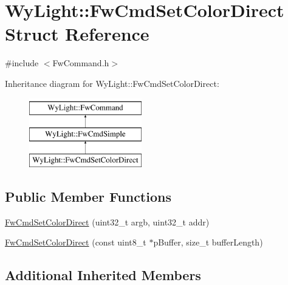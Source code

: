 \hypertarget{struct_wy_light_1_1_fw_cmd_set_color_direct}{\section{Wy\-Light\-:\-:Fw\-Cmd\-Set\-Color\-Direct Struct Reference}
\label{struct_wy_light_1_1_fw_cmd_set_color_direct}
}


{\ttfamily \#include $<$Fw\-Command.\-h$>$}

Inheritance diagram for Wy\-Light\-:\-:Fw\-Cmd\-Set\-Color\-Direct\-:\begin{figure}[H]
\begin{center}
\leavevmode
\includegraphics[height=3.000000cm]{struct_wy_light_1_1_fw_cmd_set_color_direct}
\end{center}
\end{figure}
\subsection*{Public Member Functions}
\begin{DoxyCompactItemize}
\item 
\hyperlink{struct_wy_light_1_1_fw_cmd_set_color_direct_abfae7b223f9692906dbc98e31e53c54b}{Fw\-Cmd\-Set\-Color\-Direct} (uint32\-\_\-t argb, uint32\-\_\-t addr)
\item 
\hyperlink{struct_wy_light_1_1_fw_cmd_set_color_direct_a1a82af68025d20cf7905615c4658400e}{Fw\-Cmd\-Set\-Color\-Direct} (const uint8\-\_\-t $\ast$p\-Buffer, size\-\_\-t buffer\-Length)
\end{DoxyCompactItemize}
\subsection*{Additional Inherited Members}


